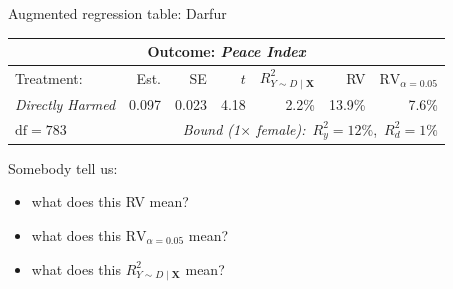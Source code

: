 \documentclass[xcolor=dvipsnames]{beamer}
\newcommand\X{{\bm X}}
\begin{document}
\begin{frame}{Augmented regression table: Darfur}
\footnotesize
\begin{table}[!h] \centering
\begin{tabular}{lrrrrrr}
\multicolumn{7}{c}{Outcome: \textit{Peace Index}} \\
\hline\hline
Treatment:       & Est.  & SE    & $t$    & $R^2_{Y\sim D \mid \X}$ & RV & $\text{RV}_{\alpha=0.05}$ \\
\hline
\textit{Directly Harmed} & 0.097 & 0.023 & 4.18 & 2.2\%  & 13.9\%   &  7.6\%               \\
\hline
$\text{df} = 783$ &       &   \multicolumn{5}{r}{\small \textit{Bound (1$\times$ female):}\ $R^2_y = 12\%$,\ $R^2_d = 1\%$}
\end{tabular}
\end{table}

\medskip
Somebody tell us:
\begin{itemize}
\item what does this RV mean?
\item what does this $\text{RV}_{\alpha=0.05}$ mean?
\item what does this $R^2_{Y\sim D \mid \X}$ mean?
\end{itemize}
\end{frame}


\end{document}

